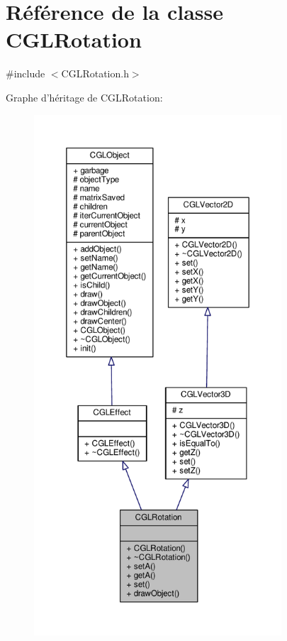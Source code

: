 \hypertarget{class_c_g_l_rotation}{\section{Référence de la classe C\-G\-L\-Rotation}
\label{class_c_g_l_rotation}
}


{\ttfamily \#include $<$C\-G\-L\-Rotation.\-h$>$}



Graphe d'héritage de C\-G\-L\-Rotation\-:\nopagebreak
\begin{figure}[H]
\begin{center}
\leavevmode
\includegraphics[height=550pt]{d4/d97/class_c_g_l_rotation__inherit__graph}
\end{center}
\end{figure}


